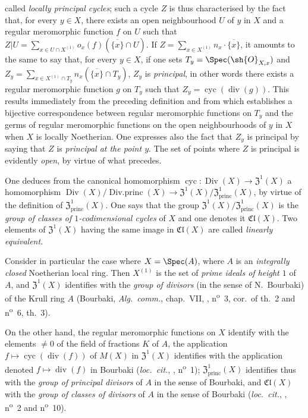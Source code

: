 called \emph{locally principal cycles};
such a cycle $Z$ is thus characterised by the fact that, for every $y\in X$, there exists an open neighbourhood $U$ of $y$ in $X$ and a regular meromorphic function $f$ on $U$ such that $Z|U=\sum_{x\in U\cap X^{(1)}}o_x(f)(\overline{\{x\}}\cap U)$.
If $Z=\sum_{x\in X^{(1)}}n_x\cdot\overline{\{x\}}$, it amounts to the same to say that, for every $y\in X$, if one sets $T_y=\Spec(\sh{O}_{X,x})$ and $Z_y=\sum_{x\in X^{(1)}\cap T_y}n_x(\overline{\{x\}}\cap T_y)$, $Z_y$ is \emph{principal}, in other words there exists a regular meromorphic function $g$ on $T_y$ such that $Z_y=\operatorname{cyc}(\operatorname{div}(g))$.
This results immediately from the preceding definition and from  which establishes a bijective correspondence between regular meromorphic functions on $T_y$ and the germs of regular meromorphic functions on the open neighbourhoods of $y$ in $X$ when $X$ is locally Noetherian.
One expresses also the fact that $Z_y$ is principal by saying that $Z$ is \emph{principal at the point $y$}.
The set of points where $Z$ is principal is evidently \emph{open}, by virtue of what precedes.

One deduces from the canonical homomorphism $\operatorname{cyc}:\operatorname{Div}(X)\to\mathfrak{Z}^1(X)$ a homomorphism $\operatorname{Div}(X)/\operatorname{Div.princ}(X)\to\mathfrak{Z}^1(X)/\mathfrak{Z}^1_{\mathrm{princ}}(X)$, by virtue of the definition of $\mathfrak{Z}^1_{\mathrm{princ}}(X)$.
One says that the group $\mathfrak{Z}^1(X)/\mathfrak{Z}^1_{\mathrm{princ}}(X)$ is the \emph{group of classes of $1$-codimensional cycles} of $X$ and one denotes it $\mathfrak{Cl}(X)$.
Two elements of $\mathfrak{Z}^1(X)$ having the same image in $\mathfrak{Cl}(X)$ are called \emph{linearly equivalent}.

\begin{env}[21.6.8]
\label{IV.21.6.8}
Consider in particular the case where $X=\Spec(A)$, where $A$ is an \emph{integrally closed} Noetherian local ring.
Then $X^{(1)}$ is the set of \emph{prime ideals of height $1$} of $A$, and $\mathfrak{Z}^1(X)$ identifies with the \emph{group of divisors} (in the sense of N.~Bourbaki) of the Krull ring $A$ (Bourbaki, \emph{Alg.~comm.}, chap.~VII, , n\textsuperscript{o}~3, cor.\ of th.~2 and n\textsuperscript{o}~6, th.~3).

On the other hand, the regular meromorphic functions on $X$ identify with the elements $\neq 0$ of the field of fractions $K$ of $A$, the application $f\mapsto\operatorname{cyc}(\operatorname{div}(f))$ of $M(X)$ in $\mathfrak{Z}^1(X)$ identifies with the application denoted $f\mapsto\operatorname{div}(f)$ in Bourbaki (\emph{loc.~cit.}, , n\textsuperscript{o}~1);
$\mathfrak{Z}^1_{\mathrm{princ}}(X)$ identifies thus with the \emph{group of principal divisors} of $A$ in the sense of Bourbaki, and $\mathfrak{Cl}(X)$ with the \emph{group of classes of divisors} of $A$ in the sense of Bourbaki (\emph{loc.~cit.}, , n\textsuperscript{o}~2 and n\textsuperscript{o}~10).
\end{env}

